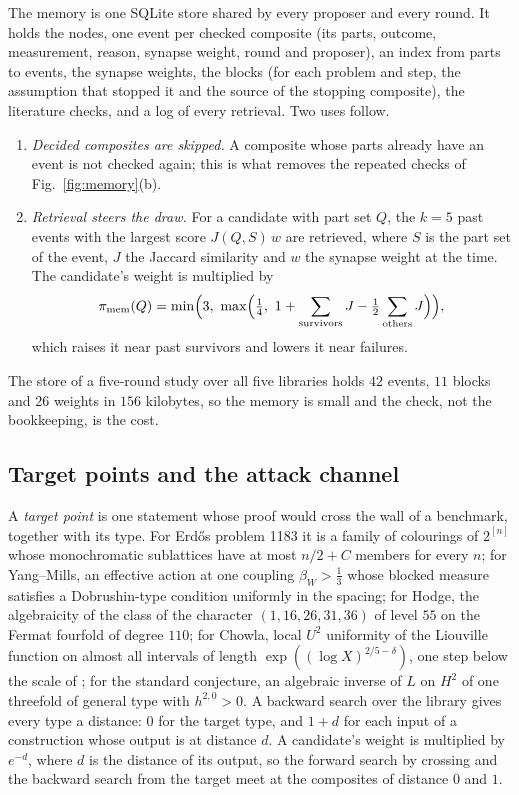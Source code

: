 The memory is one SQLite store shared by every proposer and every round. It holds the nodes, one event per checked composite (its parts, outcome, measurement, reason, synapse weight, round and proposer), an index from parts to events, the synapse weights, the blocks (for each problem and step, the assumption that stopped it and the source of the stopping composite), the literature checks, and a log of every retrieval. Two uses follow.
\begin{enumerate}[label=(\roman*),leftmargin=1.8em,itemsep=1pt]
\item \emph{Decided composites are skipped.} A composite whose parts already have an event is not checked again; this is what removes the repeated checks of Fig.~\ref{fig:memory}(b).
\item \emph{Retrieval steers the draw.} For a candidate with part set $Q$, the $k=5$ past events with the largest score $J(Q,S)\,w$ are retrieved, where $S$ is the part set of the event, $J$ the Jaccard similarity and $w$ the synapse weight at the time. The candidate's weight is multiplied by
\begin{equation}\label{eq:memprior}
\pi_{\mathrm{mem}}(Q)=\min\Bigl(3,\ \max\Bigl(\tfrac14,\ 1+\sum_{\text{survivors}}J-\tfrac12\sum_{\text{others}}J\Bigr)\Bigr),
\end{equation}
which raises it near past survivors and lowers it near failures.
\end{enumerate}
The store of a five-round study over all five libraries holds $42$ events, $11$ blocks and $26$ weights in $156$ kilobytes, so the memory is small and the check, not the bookkeeping, is the cost.

\subsection{Target points and the attack channel}

A \emph{target point} is one statement whose proof would cross the wall of a benchmark, together with its type. For Erd\H{o}s problem 1183 it is a family of colourings of $2^{[n]}$ whose monochromatic sublattices have at most $n/2+C$ members for every $n$; for Yang--Mills, an effective action at one coupling $\beta_{W}>\frac13$ whose blocked measure satisfies a Dobrushin-type condition uniformly in the spacing; for Hodge, the algebraicity of the class of the character $(1,16,26,31,36)$ of level $55$ on the Fermat fourfold of degree $110$; for Chowla, local $U^{2}$ uniformity of the Liouville function on almost all intervals of length $\exp((\log X)^{2/5-\delta})$, one step below the scale of \cite{Pil26}; for the standard conjecture, an algebraic inverse of $L$ on $H^{2}$ of one threefold of general type with $h^{2,0}>0$. A backward search over the library gives every type a distance: $0$ for the target type, and $1+d$ for each input of a construction whose output is at distance $d$. A candidate's weight is multiplied by $e^{-d}$, where $d$ is the distance of its output, so the forward search by crossing and the backward search from the target meet at the composites of distance $0$ and $1$.

